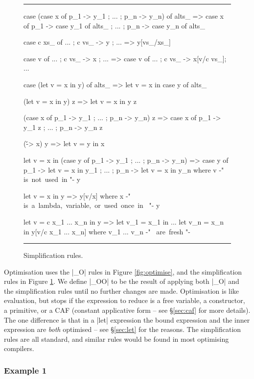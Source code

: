 \documentclass{llncs}
\newenvironment{fig}
    {\begin{figure}[tbp]\hrule}
    {\end{figure}}
\newcommand{\figend}{\hrule}
\begin{document}
\begin{fig}
\begin{code}
case (case x of {p_1 -> y_1 ; ... ; p_n -> y_n}) of alts_
    => case x of  {  p_1  -> case y_1 of alts_
                  ;  ...
                  ;  p_n  -> case y_n of alts_ }

case c xs_ of {... ; c vs_ -> y ; ...}
    => y[vs_/xs_]

case v of {... ; c vs_ -> x ; ...}
    => case v of {... ; c vs_ -> x[v/c vs_]; ...}

case (let v = x in y) of alts_
    => let v = x in case y of alts_

(let v = x in y) z
    => let v = x in y z

(case x of {p_1 -> y_1 ; ... ; p_n -> y_n}) z
    => case x of {p_1 -> y_1 z ; ... ; p_n -> y_n z}

(\v -> x) y
    => let v = y in x

let v = x in (case y of {p_1 -> y_1 ; ... ; p_n -> y_n})
    => case y of  {  p_1  -> let v = x in y_1
                  ;  ...
                  ;  p_n  -> let v = x in y_n}
    where v {-" \hbox{is not used in} "-} y

let v = x in y
    => y[v/x]
    where x {-" \hbox{is a lambda, variable, or used once in } "-} y

let v = c x_1 ... x_n in y
    =>  let v_1 = x_1 in
        ...
        let v_n = x_n in
        y[v/c x_1 ... x_n]
    where v_1 ... v_n {-" \hbox{ are fresh} "-}
\end{code}
\figend
\caption{Simplification rules.}
\label{fig:simplify}
\end{fig}

Optimisation uses the |_O| rules in Figure \ref{fig:optimise}, and the simplification rules in Figure \ref{fig:simplify}. We define |_OO| to be the result of applying both |_O| and the simplification rules until no further changes are made. Optimisation is like evaluation, but stops if the expression to reduce is a free variable, a constructor, a primitive, or a CAF (constant applicative form -- see \S\ref{sec:caf} for more details). The one difference is that in a |let| expression the bound expression and the inner expression are \textit{both} optimised -- see \S\ref{sec:let} for the reasons. The simplification rules are all standard, and similar rules would be found in most optimising compilers.

\subsubsection{Example 1} \hfill
\end{document}
